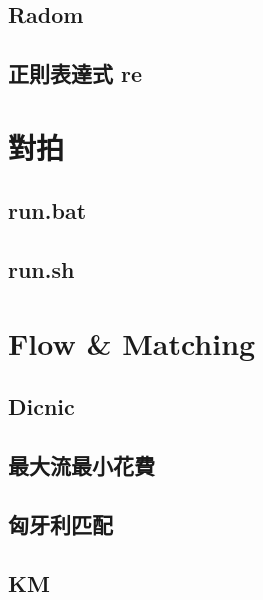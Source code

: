 \subsection{Radom}


\subsection{正則表達式 re}


\section{對拍}

\subsection{run.bat}


\subsection{run.sh}

\section{Flow \& Matching}

\subsection{Dicnic}


\subsection{最大流最小花費}


\subsection{匈牙利匹配}


\subsection{KM}


